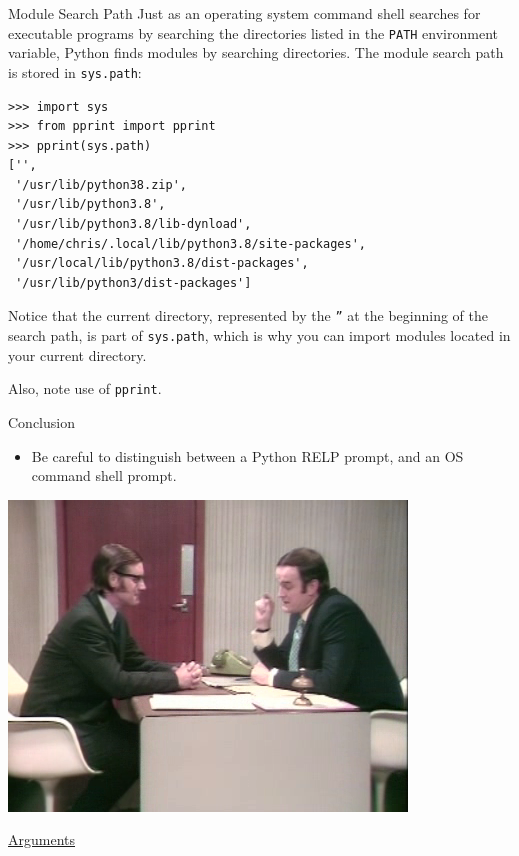 \documentclass[smaller, aspectratio=1610]{beamer}
\begin{document}
\begin{frame}[label={sec:orgb9e3e4b},fragile]{Module Search Path}
 Just as an operating system command shell searches for executable programs by searching the directories listed in the \texttt{PATH} environment variable, Python finds modules by searching directories. The module search path is stored in \texttt{sys.path}:

\lstset{language=Python,label= ,caption= ,captionpos=b,numbers=none}
\begin{lstlisting}
>>> import sys
>>> from pprint import pprint
>>> pprint(sys.path)
['',
 '/usr/lib/python38.zip',
 '/usr/lib/python3.8',
 '/usr/lib/python3.8/lib-dynload',
 '/home/chris/.local/lib/python3.8/site-packages',
 '/usr/local/lib/python3.8/dist-packages',
 '/usr/lib/python3/dist-packages']
\end{lstlisting}

Notice that the current directory, represented by the \texttt{''} at the beginning of the search path, is part of \texttt{sys.path}, which is why you can import modules located in your current directory.

Also, note use of \texttt{pprint}.
\end{frame}

\begin{frame}[label={sec:org109a38b}]{Conclusion}
\begin{itemize}
\item Be careful to distinguish between a Python RELP prompt, and an OS command shell prompt.
\end{itemize}

\begin{center}
\includegraphics[height=.4\textheight]{./Argument_Clinic.png}
\end{center}


\href{https://www.youtube.com/watch?v=DkQhK8O9Jik}{Arguments}
\end{frame}
\end{document}
